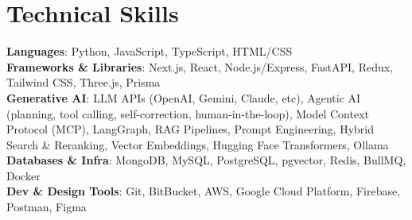 \documentclass[letterpaper,11pt]{article}
\begin{document}
\section{Technical Skills}
  \begin{itemize}[leftmargin=0.15in, label={}]
    \small{\item{
      \textbf{Languages}{: Python, JavaScript, TypeScript, HTML/CSS} \\
      \textbf{Frameworks \& Libraries}{: Next.js, React, Node.js/Express, FastAPI, Redux, Tailwind CSS, Three.js, Prisma} \\
      \textbf{Generative AI}{: LLM APIs (OpenAI, Gemini, Claude, etc), Agentic AI (planning, tool calling, self-correction, human-in-the-loop), Model Context Protocol (MCP), LangGraph, RAG Pipelines, Prompt Engineering, Hybrid Search \& Reranking, Vector Embeddings, Hugging Face Transformers, Ollama} \\
      \textbf{Databases \& Infra}{: MongoDB, MySQL, PostgreSQL, pgvector, Redis, BullMQ, Docker} \\
      \textbf{Dev \& Design Tools}{: Git, BitBucket, AWS, Google Cloud Platform, Firebase, Postman, Figma} \\
    }}
  \end{itemize}
\end{document}
